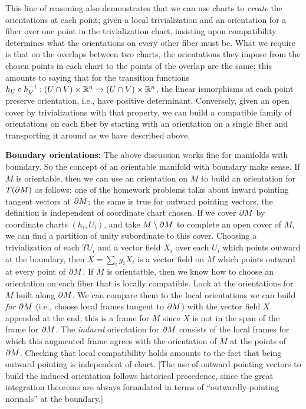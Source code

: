 This line of reasoning also demonstrates that we can use charts to {\it create} the orientations 
at each point; given a local trivialization and an orientation for a fiber over one point in the 
trivialization chart, insisting upon compatibility determines what the orientations
on every other fiber must be. What we require is that on the overlaps between 
two charts, the orientations they impose from the chosen points in each chart to the points of the overlap 
are the same; this amounts to saying
that for the transition functions $h_U\circ h_V^{-1}:(U\cap V)\times {\Bbb R}^n\rightarrow (U\cap V)\times {\Bbb R}^n$,
the linear ismorphisms at each point preserve orientation, i.e., have positive
determinant. Conversely, given an open cover by trivializations with that property, we
can build a compatible family of orientations on each fiber by starting with an orientation
on a single fiber and transporting it around as we have described above.

\msk

{\bf Boundary orientations:} The above discussion works fine for manifolds with boundary. 
So the concept of an orientable manifold with boundary make sense. If $M$ is orientable,
then we can use an orientation on $M$ to build an orientation for $T(\partial M)$ as follows:
one of the homework problems talks about inward pointing tangent vectors at $\partial M$; the same is
true for outward pointing vectors, the definition is independent of coordinate chart chosen.
If we cover $\partial M$ by coordinate charts $(h_i,U_i)$, and take $M\setminus \partial M$ to 
complete an open cover of $M$,
we can find a partition of unity subordinate to this cover. Choosing a trivialization of each $TU_i$
and a vector field $X_i$ over each $U_i$ which points outward at the boundary, then $X=\sum_ig_iX_i$
is a vector field on $M$ which points outward at every point of $\partial M$. If $M$ is orientatble,
then we know how to choose an orientation on each fiber that is locally compatible. Look at the
orientations for $M$ built along $\partial M$. We can compare them to the local orientations we can build 
{\it for} $\partial M$ (i.e., choose local frames tangent to $\partial M$) with the vector field $X$
appended at the end; this is a frame for $M$ since $X$ is not in the span of the frame for $\partial M$.
The {\it induced} orientation for $\partial M$ consists of the local frames for which this augmented
frame agrees with the orientation of $M$ at the points of $\partial M$. Checking that local 
compatibility holds amounts to the fact that being outward pointing is independent of chart.
[The use of outward pointing vectors to build the induced orientation follows historical precedence, 
since the great integration theorems are always formulated in terms of ``outwardly-pointing normals''
at the boundary.]

